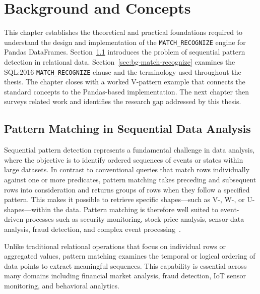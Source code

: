 \chapter{Background and Concepts}
\label{chap:background}

This chapter establishes the theoretical and practical foundations
required to understand the design and implementation of the
\texttt{MATCH\_RECOGNIZE} engine for Pandas DataFrames.
Section~\ref{sec:bg-pattern-matching} introduces the problem of
sequential pattern detection in relational data.
Section~\ref{sec:bg-match-recognize} examines the SQL:2016
\texttt{MATCH\_RECOGNIZE} clause and the terminology used throughout
the thesis.  The chapter closes with a worked V-pattern example that
connects the standard concepts to the Pandas-based implementation.
The next chapter then surveys related work and identifies the
research gap addressed by this thesis.

\section{Pattern Matching in Sequential Data Analysis}
\label{sec:bg-pattern-matching}

Sequential pattern detection represents a fundamental challenge in
data analysis, where the objective is to identify ordered sequences
of events or states within large datasets.  In contrast to
conventional queries that match rows individually against one or
more predicates, pattern matching takes preceding and subsequent
rows into consideration and returns groups of rows when they follow
a specified pattern.  This makes it possible to retrieve specific
shapes---such as V-, W-, or U-shapes---within the data.  Pattern
matching is therefore well suited to event-driven processes such as
security monitoring, stock-price analysis, sensor-data analysis,
fraud detection, and complex event processing~\cite{OracleMR}.

Unlike traditional relational operations that focus on individual
rows or aggregated values, pattern matching examines the temporal
or logical ordering of data points to extract meaningful sequences.
This capability is essential across many domains including financial
market analysis, fraud detection, IoT sensor monitoring, and
behavioral analytics.

